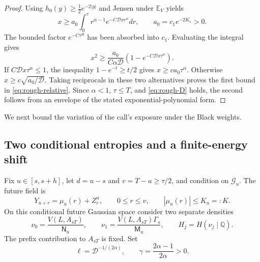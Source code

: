 \documentclass[11pt,a4paper]{amsart}
\theoremstyle{plain}
\theoremstyle{definition}
\theoremstyle{remark}
\newcommand{\EE}{\mathbb{E}}
\newcommand{\QQ}{\mathbb{Q}}
\newcommand{\G}{\mathcal G}
\begin{document}
\begin{proof}
Using $h_0(y)\ge\tfrac12e^{-2|y|}$ and Jensen under $\EE_V$ yields
\begin{equation}\label{eq:selfconsistent-integral}
 x\ge a_0\int_0^\tau r^{\alpha-1}
                  e^{-C\mathscr D x r^\alpha}dr,
 \qquad a_0=c_1e^{-2K_s}>0.
\end{equation}
The bounded factor $e^{-C\tau^H}$ has been absorbed into $c_1$. Evaluating the integral gives
\begin{equation}\label{eq:selfconsistent-inequality}
 x^2\ge\frac{a_0}{C\alpha\mathscr D}
                (1-e^{-C\mathscr D x\tau^\alpha}).
\end{equation}
If $C\mathscr D x\tau^\alpha\le1$, the inequality $1-e^{-t}\ge t/2$ gives $x\ge c a_0\tau^\alpha$. Otherwise $x\ge c\sqrt{a_0/\mathscr D}$. Taking reciprocals in these two alternatives proves the first bound in \eqref{eq:rough-relative}. Since $\alpha<1$, $\tau\le T$, and \eqref{eq:rough-D} holds, the second follows from an envelope of the stated exponential-polynomial form.
\end{proof}

We next bound the variation of the call's exposure under the Black weights.

\subsection{Two conditional entropies and a finite-energy shift}
Fix $u\in[s,s+h]$, let $d=u-s$ and $v=T-u\ge\tau/2$, and condition on $\G_u$. The future field is
\[
 Y_{u+r}=\mu_u(r)+Z_r^u,\qquad 0\le r\le v,
 \qquad |\mu_u(r)|\le K_u=:K.
\]
On this conditional future Gaussian space consider two separate densities
\begin{equation}\label{eq:two-densities}
 \nu_0=\frac{V(L,A_{sT})}{\mathsf N_u},\qquad
 \nu_1=\frac{V(L,A_{sT})\Gamma_s}{\mathsf M_u},
 \qquad H_j=H(\nu_j\mid\QQ).
\end{equation}
The prefix contribution to $A_{sT}$ is fixed. Set
\begin{equation}\label{eq:boundary-scale}
 \ell=\mathscr D^{-1/(2\alpha)},\qquad
 \gamma=\frac{2\alpha-1}{2\alpha}>0.
\end{equation}
\end{document}
